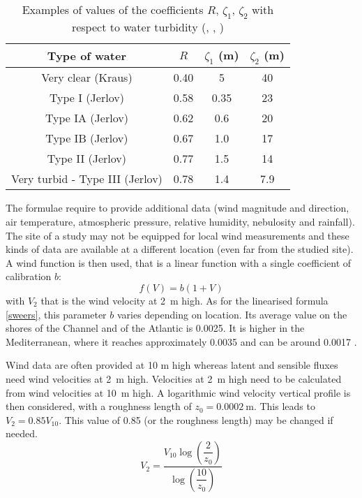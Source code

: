 \begin{table}[ptbh]
\caption{Examples of values of the coefficients $R$, $\zeta_{1}$, $\zeta_{2}$
  with respect to water turbidity (\cite{paulson_irradiance_1977},
  \cite{jerlov_optical_1968}, \cite{kraus_atmos_1972})}%
\label{jerlov}%
\centering
\begin{tabular}
[c]{|c|c|c|c|}\hline
Type of water & $R$ & $\zeta_{1}$ (m) & $\zeta_{2}$ (m)\\\hline
Very clear (Kraus) & 0.40 & 5 & 40\\\hline
Type I (Jerlov) & 0.58 & 0.35 & 23\\\hline
Type IA (Jerlov) & 0.62 & 0.6 & 20\\\hline
Type IB (Jerlov) & 0.67 & 1.0 & 17\\\hline
Type II (Jerlov) & 0.77 & 1.5 & 14\\\hline
Very turbid - Type III (Jerlov) & 0.78 & 1.4 & 7.9\\\hline
\end{tabular}
\end{table}

The formulae require to provide additional data (wind magnitude and direction,
air temperature, atmospheric pressure, relative humidity, nebulosity and rainfall).
The site of a study may not be equipped for local wind measurements and these
kinds of data are available at a different location (even far from the studied
site). A wind function is then used, that is a linear function with a single
coefficient of calibration $b$:
\begin{equation}
f(V) = b(1+V)
\end{equation}
with $V_{2}$ that is the wind velocity at 2~m high. As for the linearised
formula \eqref{sweers}, this parameter $b$ varies depending on location. Its
average value on the shores of the Channel and of the Atlantic is 0.0025. It
is higher in the Mediterranean, where it reaches approximately 0.0035 and can
be around 0.0017 \cite{salencon_lac_1997}.

Wind data are often provided at 10 m high whereas latent and sensible fluxes
need wind velocities at 2~m high. Velocities at 2~m high need to be calculated
from wind velocities at 10~m high. A logarithmic wind velocity vertical profile is
then considered, with a roughness length of $z_{0} =
0.0002~\mathrm{{m}}$. This leads to $V_{2} = 0.85 V_{10}$. This value
of 0.85 (or the roughness length) may be changed if needed.
\begin{equation}
V_{2} = \dfrac{V_{10}\log\left(\dfrac{2}{z_{0}}\right)}{\log\left(\dfrac{10}{z_{0}}\right)}%
\end{equation}


